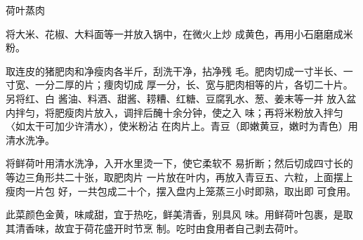 \begin{recipe}{荷叶蒸肉}

\ingredients


\cooking

\step 	将大米、花椒、大料面等一并放入锅中，在微火上炒 成黄色，再用小石磨磨成米粉。

\step 	取连皮的猪肥肉和净瘦肉各半斤，刮洗干净，拈净残 毛。肥肉切成一寸半长、一寸宽、一分二厚的片；痩肉切成 厚一分，长、宽与肥肉相等的片，各切二十片。另将红、白 酱油、料酒、甜酱、耢糟、红糖、豆腐乳水、葱、姜末等一并 放入盆内拌匀，将肥瘦肉片放入，调拌后醃十余分钟，使之入 味；再将米粉放入拌匀〈如太干可加少许清水），使米粉沾 在肉片上。青豆（即嫩黄豆，嫩时为青色）用清水洗净。

\step 	将鲜荷叶用清水洗净，入开水里烫一下，使它柔软不 易折断；然后切成四寸长的等边三角形共二十张，取肥肉片 一片放在叶内，再放入青豆五、六粒，上面摆上瘦肉一片包 好，一共包成二十个，摆入盘内上笼蒸三小时即熟，取出即 可食用。

\notes

此菜颜色金黄，味咸甜，宜于热吃，鲜美清香，别具风 味。用鲜荷叶包裹，是取其清香味，故宜于荷花盛开时节烹 制。吃时由食用者自己剥去荷叶。

\end{recipe}

